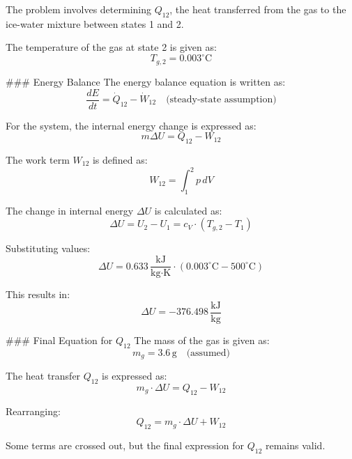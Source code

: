 The problem involves determining \( Q_{12} \), the heat transferred from the gas to the ice-water mixture between states 1 and 2.

The temperature of the gas at state 2 is given as:  
\[
T_{g,2} = 0.003^\circ \text{C}
\]

### Energy Balance  
The energy balance equation is written as:  
\[
\frac{dE}{dt} = \dot{Q}_{12} - \dot{W}_{12} \quad \text{(steady-state assumption)}
\]

For the system, the internal energy change is expressed as:  
\[
m \Delta U = Q_{12} - W_{12}
\]

The work term \( W_{12} \) is defined as:  
\[
W_{12} = \int_{1}^{2} p \, dV
\]

The change in internal energy \( \Delta U \) is calculated as:  
\[
\Delta U = U_2 - U_1 = c_V \cdot (T_{g,2} - T_1)
\]

Substituting values:  
\[
\Delta U = 0.633 \, \frac{\text{kJ}}{\text{kg·K}} \cdot (0.003^\circ \text{C} - 500^\circ \text{C})
\]

This results in:  
\[
\Delta U = -376.498 \, \frac{\text{kJ}}{\text{kg}}
\]

### Final Equation for \( Q_{12} \)  
The mass of the gas is given as:  
\[
m_g = 3.6 \, \text{g} \quad \text{(assumed)}
\]

The heat transfer \( Q_{12} \) is expressed as:  
\[
m_g \cdot \Delta U = Q_{12} - W_{12}
\]

Rearranging:  
\[
Q_{12} = m_g \cdot \Delta U + W_{12}
\]  

Some terms are crossed out, but the final expression for \( Q_{12} \) remains valid.